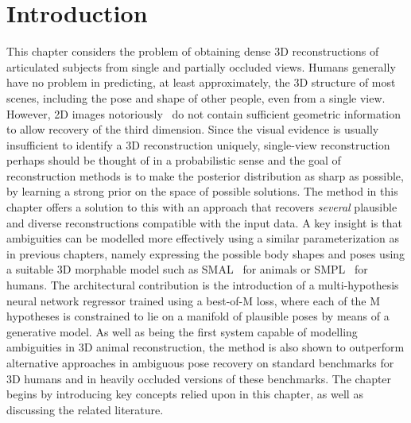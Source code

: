 \section{Introduction}\label{s:intro}

This chapter considers the problem of obtaining dense 3D reconstructions of articulated subjects from single and partially occluded views. Humans generally have no problem in predicting, at least approximately, the 3D structure of most scenes, including the pose and shape of other people, even from a single view.
However, 2D images notoriously~\citep{Faugeras01geometry} do not contain sufficient geometric information to allow recovery of the third dimension. 
Since the visual evidence is usually insufficient to identify a 3D reconstruction uniquely, single-view reconstruction perhaps should be thought of in a probabilistic sense and the goal of reconstruction methods is to make the posterior distribution as sharp as possible, by learning a strong prior on the space of possible solutions.
The method in this chapter offers a solution to this with an approach that recovers \emph{several} plausible and diverse reconstructions compatible with the input data.
A key insight is that ambiguities can be modelled more effectively using a similar parameterization as in previous chapters, namely expressing the possible body shapes and poses using a suitable 3D morphable model such as SMAL~\cite{zuffi2017menagerie} for animals or SMPL~\cite{loper15smpl} for humans.
The architectural contribution is the introduction of a multi-hypothesis neural network regressor trained using a best-of-M loss, where each of the M hypotheses is constrained to lie on a manifold of plausible poses by means of a generative model.
As well as being the first system capable of modelling ambiguities in 3D animal reconstruction, the method is also shown to outperform alternative approaches in ambiguous pose recovery on standard benchmarks for 3D humans and in heavily occluded versions of these benchmarks. The chapter begins by introducing key concepts relied upon in this chapter, as well as discussing the related literature. 

